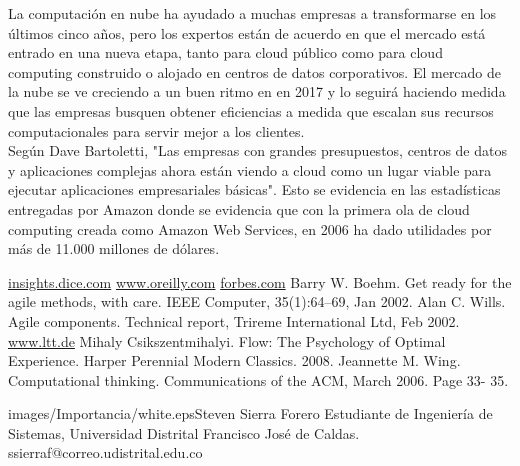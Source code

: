 \begin{multicols}{2}
La computación en nube ha ayudado a muchas empresas a transformarse en los últimos cinco años, pero los expertos están de acuerdo en que el mercado está entrado en una nueva etapa, tanto para cloud público como para cloud computing construido o alojado en centros de datos corporativos. El mercado de la nube se ve creciendo a un buen ritmo en en 2017 y lo seguirá haciendo medida que las empresas busquen obtener eficiencias a medida que escalan sus recursos computacionales para servir mejor a los clientes.\\


Según Dave Bartoletti, "Las empresas con grandes presupuestos, centros de datos y aplicaciones complejas ahora están viendo a cloud como un lugar viable para ejecutar aplicaciones empresariales básicas". Esto se evidencia en las estadísticas entregadas por Amazon donde se evidencia que con la primera ola de cloud computing creada como Amazon Web Services, en 2006 ha dado utilidades por más de 11.000 millones de dólares.\\



\begin{bibliografia}
\href{http://insights.dice.com/trends/}{insights.dice.com}
\href{https://www.oreilly.com/ideas/5-software-development-trends-shaping- enterprise}{www.oreilly.com}
\href{https://forbes.com}{forbes.com}
Barry W. Boehm. Get ready for the agile methods, with care. IEEE Computer, 35(1):64–69, Jan 2002.
Alan C. Wills. Agile components. Technical report, Trireme International	Ltd,	Feb	2002. \href{http://www.ltt.de/otland/experts/a.c.wills.shtml}{www.ltt.de}
Mihaly Csikszentmihalyi. Flow: The Psychology of Optimal Experience. Harper Perennial Modern Classics. 2008.
Jeannette M. Wing. Computational thinking. Communications of the ACM, March 2006. Page 33- 35.
\end{bibliografia}


\begin{biografia}{images/Importancia/white.eps}{Steven Sierra Forero} Estudiante de Ingeniería de Sistemas, Universidad Distrital Francisco José de Caldas.\\ssierraf@correo.udistrital.edu.co
\end{biografia}

\raggedcolumns
\pagebreak


\end{multicols}

\clearpage
\pagebreak
